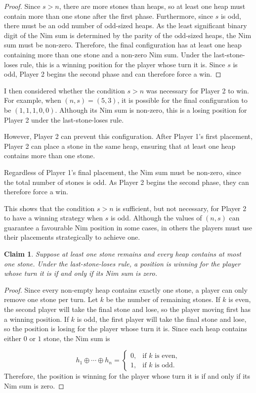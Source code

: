 \documentclass[11pt]{article}
\newcommand{\keywordfont}{\textsc}
\newcommand{\keyword}[1]{%
  \marginpar{\raggedright\small\keywordfont{#1}}}
\newtheorem{claim}{Claim}
\begin{document}
\begin{proof}
Since $s>n$, there are more stones than heaps, so at least one heap must contain more than one stone after the first phase.
Furthermore, since $s$ is odd, there must
be an odd number of odd-sized heaps.
As the least significant binary digit of
the Nim sum is determined by the parity
of the odd-sized heaps, the Nim sum
must be non-zero.
Therefore, the final configuration has
at least one heap containing more than
one stone and a non-zero Nim sum.
Under the last-stone-loses rule, this
is a winning position for the player
whose turn it is.
Since $s$ is odd, Player 2 begins the
second phase and can therefore force a win.
\end{proof}


\keyword{CHECK}
I then considered whether the condition $s>n$ was necessary for Player 2 to win.
For example, when $(n,s)=(5,3)$, it is possible for the final configuration to be $(1,1,1,0,0)$. Although its Nim sum is non-zero, this is a losing position for Player 2 under the last-stone-loses rule.

However, Player 2 can prevent this configuration. After Player 1's first placement, Player 2 can place a stone in the same heap, ensuring that at least one heap contains more than one stone.

Regardless of Player 1's final placement, the Nim sum must be non-zero, since the total number of stones is odd.
As Player 2 begins the second phase, they
can therefore force a win.

\keyword{OBSERVE}

This shows that the condition $s>n$ is
sufficient, but not necessary, for
Player 2 to have a winning strategy
when $s$ is odd.
Although the values of $(n,s)$ can guarantee
a favourable Nim position in some cases,
in others the players must use their
placements strategically to achieve one.

\begin{claim}
Suppose at least one stone remains and every heap contains at most one stone. Under the last-stone-loses rule, a position is winning for the player whose turn it is if and only if its Nim sum is zero.
\end{claim}

\begin{proof}
Since every non-empty heap contains exactly one stone, a player can only remove one stone per turn.
Let $k$ be the number of remaining stones.
If $k$ is even, the second player will take
the final stone and lose, so the player
moving first has a winning position.
If $k$ is odd, the first player will take
the final stone and lose, so the position
is losing for the player whose turn it is.
Since each heap contains either $0$ or $1$
stone, the Nim sum is

$$ h_1\oplus\cdots\oplus h_n = \begin{cases}
0, & \text{if } k \text{ is even},\\
1, & \text{if } k \text{ is odd}. \end{cases}$$
Therefore, the position is winning for
the player whose turn it is if and only
if its Nim sum is zero.
\end{proof}
\end{document}
